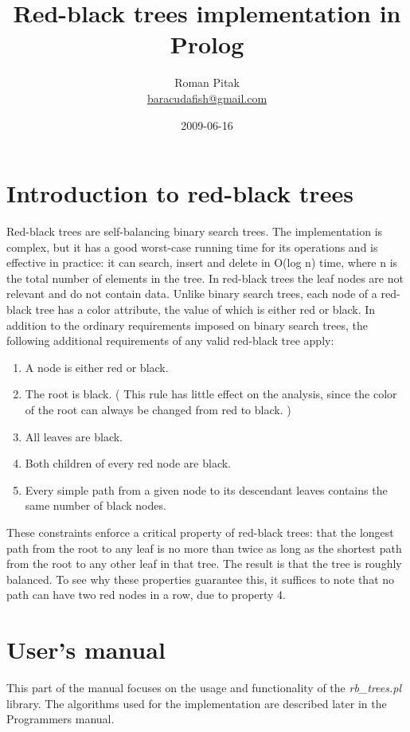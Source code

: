 \documentclass{article}
\title{Red-black trees implementation in Prolog}
\author{Roman Pitak \\ \url{baracudafish@gmail.com}}
\date{2009-06-16}
\newcommand{\inlinecode}[1]{\textit{#1}}
\begin{document}
\maketitle
\tableofcontents
\newpage
\section[Introduction]{Introduction to red-black trees}
Red-black trees are self-balancing binary search trees. The implementation is complex, but it has a good worst-case running time for its operations and is effective in practice: it can search, insert and delete in O(log n) time, where n is the total number of elements in the tree. In red-black trees the leaf nodes are not relevant and do not contain data. Unlike binary search trees, each node of a red-black tree has a color attribute, the value of which is either red or black. In addition to the ordinary requirements imposed on binary search trees, the following additional requirements of any valid red-black tree apply:

\begin{enumerate}
\item A node is either red or black.
\item The root is black. ( This rule has little effect on the analysis, since the color of the root can always be changed from red to black. )
\item All leaves are black.
\item Both children of every red node are black.
\item Every simple path from a given node to its descendant leaves contains the same number of black nodes.
\end{enumerate}

These constraints enforce a critical property of red-black trees: that the longest path from the root to any leaf is no more than twice as long as the shortest path from the root to any other leaf in that tree. The result is that the tree is roughly balanced. To see why these properties guarantee this, it suffices to note that no path can have two red nodes in a row, due to property 4.

\section{User's manual}
This part of the manual focuses on the usage and functionality of the \inlinecode{rb\_trees.pl} library. 
The algorithms used for the implementation are described later in the Programmers manual\pageref{programmers_manual}.
\end{document}
